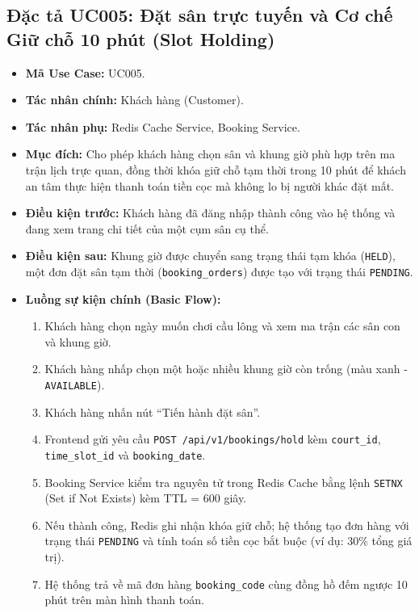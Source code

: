 \subsection{Đặc tả UC005: Đặt sân trực tuyến và Cơ chế Giữ chỗ 10 phút (Slot Holding)}
\begin{itemize}[leftmargin=1.5cm]
    \item \textbf{Mã Use Case:} UC005.
    \item \textbf{Tác nhân chính:} Khách hàng (Customer).
    \item \textbf{Tác nhân phụ:} Redis Cache Service, Booking Service.
    \item \textbf{Mục đích:} Cho phép khách hàng chọn sân và khung giờ phù hợp trên ma trận lịch trực quan, đồng thời khóa giữ chỗ tạm thời trong 10 phút để khách an tâm thực hiện thanh toán tiền cọc mà không lo bị người khác đặt mất.
    \item \textbf{Điều kiện trước:} Khách hàng đã đăng nhập thành công vào hệ thống và đang xem trang chi tiết của một cụm sân cụ thể.
    \item \textbf{Điều kiện sau:} Khung giờ được chuyển sang trạng thái tạm khóa (\texttt{HELD}), một đơn đặt sân tạm thời (\texttt{booking\_orders}) được tạo với trạng thái \texttt{PENDING}.
    \item \textbf{Luồng sự kiện chính (Basic Flow):}
    \begin{enumerate}
        \item Khách hàng chọn ngày muốn chơi cầu lông và xem ma trận các sân con và khung giờ.
        \item Khách hàng nhấp chọn một hoặc nhiều khung giờ còn trống (màu xanh - \texttt{AVAILABLE}).
        \item Khách hàng nhấn nút ``Tiến hành đặt sân''.
        \item Frontend gửi yêu cầu \texttt{POST /api/v1/bookings/hold} kèm \texttt{court\_id}, \texttt{time\_slot\_id} và \texttt{booking\_date}.
        \item Booking Service kiểm tra nguyên tử trong Redis Cache bằng lệnh \texttt{SETNX} (Set if Not Exists) kèm TTL = 600 giây.
        \item Nếu thành công, Redis ghi nhận khóa giữ chỗ; hệ thống tạo đơn hàng với trạng thái \texttt{PENDING} và tính toán số tiền cọc bắt buộc (ví dụ: $30\%$ tổng giá trị).
        \item Hệ thống trả về mã đơn hàng \texttt{booking\_code} cùng đồng hồ đếm ngược 10 phút trên màn hình thanh toán.
    \end{enumerate}

\end{itemize}

